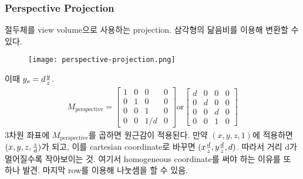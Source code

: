 \subsubsection{Perspective Projection}

절두체를 view volume으로 사용하는 projection. 삼각형의 닮음비를 이용해 변환할 수 있다.
\begin{figure}[h]
  \centering
  \texttt{[image: perspective-projection.png]}
\end{figure}
이때 $y_s = d {y \over z}$.
$$
\begin{aligned}
  M_{\text{perspective}} =
  \begin{bmatrix}
    1 & 0 & 0 & 0 \\
    0 & 1 & 0 & 0 \\
    0 & 0 & 1 & 0 \\
    0 & 0 & 1/d & 0
  \end{bmatrix}
  \text{or}
  \begin{bmatrix}
    d & 0 & 0 & 0 \\
    0 & d & 0 & 0 \\
    0 & 0 & d & 0 \\
    0 & 0 & 1 & 0
  \end{bmatrix}
\end{aligned}
$$
3차원 좌표에 $M_{\text{perspective}}$를 곱하면 원근감이 적용된다. 만약 $(x, y, z, 1)$에 적용하면 $(x, y, z, {z \over d})$가 되고, 이를 cartesian coordinate로 바꾸면 $(x{d \over z}, y{d \over z}, d)$. 따라서 거리 d가 멀어질수록 작아보이는 것. 여기서 homogeneous coordinate를 써야 하는 이유를 또 하나 발견. 마지막 row를 이용해 나눗셈을 할 수 있음.

